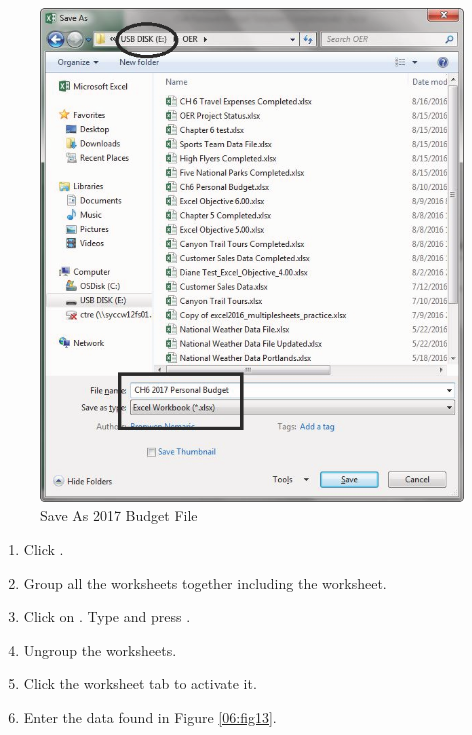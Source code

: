 \begin{figure}[H]
	\centering
	\includegraphics[width=\maxwidth{.95\linewidth}]{gfx/ch06_fig12}
	\caption{Save As 2017 Budget File}
	\label{06:fig12}
\end{figure}

\begin{enumerate}[resume]
	\item Click .
	\item Group all the worksheets together including the  worksheet.
	\item Click on . Type  and press .
	\item Ungroup the worksheets.
	\item Click the  worksheet tab to activate it. 
	\item Enter the data found in Figure \ref{06:fig13}.
\end{enumerate}

